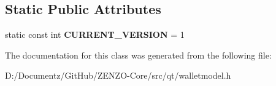 \subsection*{Static Public Attributes}
\begin{DoxyCompactItemize}
\item 
\mbox{\label{class_send_coins_recipient_a275b0eea2c3140d69fb282d217a790f5}} 
static const int {\bfseries C\+U\+R\+R\+E\+N\+T\+\_\+\+V\+E\+R\+S\+I\+ON} = 1
\end{DoxyCompactItemize}


The documentation for this class was generated from the following file\+:\begin{DoxyCompactItemize}
\item 
D\+:/\+Documentz/\+Git\+Hub/\+Z\+E\+N\+Z\+O-\/\+Core/src/qt/walletmodel.\+h\end{DoxyCompactItemize}
